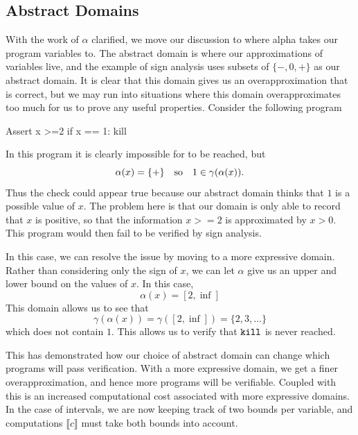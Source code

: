 \subsection{Abstract Domains}

With the work of $\alpha$ clarified, we move our discussion to where alpha takes our program variables to.
The abstract domain is where our approximations of variables live, and the example of sign analysis uses subsets of $\{-, 0, +\}$ as our abstract domain.
It is clear that this domain gives us an overapproximation that is correct, but we may run into situations where this domain overapproximates too much for us to prove any useful properties.
Consider the following program
\begin{code}
Assert x >=2
if x == 1:
  kill
\end{code}
In this program it is clearly impossible for \kil to be reached, but
\[\alpha(x) = \{+\}\quad \text{so} \quad 1 \in \gamma(\alpha(x)).\]
Thus the check  could appear true because our abstract domain thinks that $1$ is a possible value of $x$.
The problem here is that our domain is only able to record that $x$ is positive, so that the information $x >=2 $ is approximated by $x > 0$.
This program would then fail to be verified by sign analysis.

In this case, we can resolve the issue by moving to a more expressive domain.
Rather than considering only the sign of $x$, we can let $\alpha$ give us an upper and lower bound on the values of $x$.
In this case, 
\[
  \alpha(x) = [2, \inf]
\]
This domain allows us to see that
\[
  \gamma(\alpha(x)) = \gamma([2, \inf]) = \{2, 3, \ldots\}
\]
which does not contain $1$.
This allows us to verify that $\texttt{kill}$ is never reached.

This has demonstrated how our choice of abstract domain can change which programs will pass verification.
With a more expressive domain, we get a finer overapproximation, and hence more programs will be verifiable.
Coupled with this is an increased computational cost associated with more expressive domains. 
In the case of intervals, we are now keeping track of two bounds per variable, and computations $\llbracket c \rrbracket$ must take both bounds into account.

